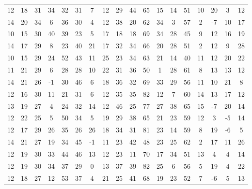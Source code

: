 \begin{sidewaystable}
\begin{tabular}{cccccccccccccccccc}
    12    & 18    & 31    & 34    & 32    & 31    & 7     & 12    & 29    & 44     & 65     & 15     & 14     & 51     & 10     & 20     & 3      & 12     \\
    14    & 20    & 34    & 6     & 36    & 30    & 4     & 12    & 38    & 20     & 62     & 34     & 3      & 57     & 2      & -7     & 10     & 17     \\
    10    & 15    & 30    & 40    & 39    & 23    & 5     & 17    & 18    & 18     & 69     & 34     & 28     & 45     & 9      & 12     & 16     & 19     \\
    14    & 17    & 29    & 8     & 23    & 40    & 21    & 17    & 32    & 34     & 66     & 20     & 28     & 51     & 2      & 12     & 9      & 28     \\
    10    & 15    & 29    & 24    & 52    & 43    & 11    & 25    & 23    & 34     & 63     & 21     & 14     & 40     & 11     & 12     & 20     & 22     \\
    11    & 21    & 29    & 6     & 28    & 28    & 10    & 22    & 31    & 36     & 50     & 1      & 28     & 61     & 8      & 13     & 13     & 12     \\
    14    & 21    & 26    & -1    & 30    & 46    & 6     & 18    & 36    & 32     & 69     & 33     & 29     & 56     & 11     & 10     & 21     & 8      \\
    12    & 16    & 30    & 11    & 21    & 31    & 6     & 12    & 35    & 35     & 82     & 12     & 7      & 60     & 14     & 13     & 17     & 12     \\
    13    & 19    & 27    & 4     & 24    & 32    & 14    & 12    & 46    & 25     & 77     & 27     & 38     & 65     & 15     & -7     & 20     & 14     \\
    12    & 22    & 25    & 5     & 50    & 34    & 5     & 19    & 29    & 38     & 65     & 21     & 23     & 59     & 12     & 3      & -5     & 14     \\
    12    & 17    & 29    & 26    & 35    & 26    & 26    & 18    & 34    & 31     & 81     & 23     & 14     & 59     & 8      & 19     & -6     & 5      \\
    14    & 21    & 27    & 19    & 34    & 45    & -1    & 11    & 23    & 42     & 48     & 23     & 25     & 62     & 2      & 17     & 11     & 26     \\
    12    & 19    & 30    & 33    & 44    & 46    & 13    & 12    & 23    & 11     & 70     & 17     & 34     & 51     & 13     & 4      & 4      & 14     \\
    12    & 19    & 30    & 34    & 37    & 29    & 0     & 13    & 37    & 39     & 82     & 25     & 6      & 56     & 5      & 19     & 4      & 22     \\
    12    & 18    & 27    & 12    & 53    & 37    & 4     & 21    & 25    & 41     & 68     & 19     & 23     & 52     & 7      & -6     & 5      & 13    
         \end{tabular}
\end{sidewaystable}
